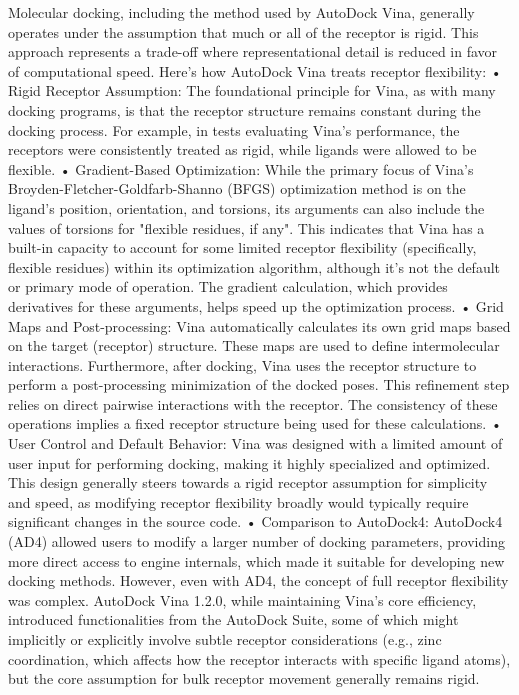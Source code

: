 \documentclass[11pt]{article}
\begin{document}
Molecular docking, including the method used by AutoDock Vina, generally operates under the assumption that much or all of the receptor is rigid. This approach represents a trade-off where representational detail is reduced in favor of computational speed.
Here's how AutoDock Vina treats receptor flexibility:
• Rigid Receptor Assumption: The foundational principle for Vina, as with many docking programs, is that the receptor structure remains constant during the docking process. For example, in tests evaluating Vina's performance, the receptors were consistently treated as rigid, while ligands were allowed to be flexible.
• Gradient-Based Optimization: While the primary focus of Vina's Broyden-Fletcher-Goldfarb-Shanno (BFGS) optimization method is on the ligand's position, orientation, and torsions, its arguments can also include the values of torsions for "flexible residues, if any". This indicates that Vina has a built-in capacity to account for some limited receptor flexibility (specifically, flexible residues) within its optimization algorithm, although it's not the default or primary mode of operation. The gradient calculation, which provides derivatives for these arguments, helps speed up the optimization process.
• Grid Maps and Post-processing: Vina automatically calculates its own grid maps based on the target (receptor) structure. These maps are used to define intermolecular interactions. Furthermore, after docking, Vina uses the receptor structure to perform a post-processing minimization of the docked poses. This refinement step relies on direct pairwise interactions with the receptor. The consistency of these operations implies a fixed receptor structure being used for these calculations.
• User Control and Default Behavior: Vina was designed with a limited amount of user input for performing docking, making it highly specialized and optimized. This design generally steers towards a rigid receptor assumption for simplicity and speed, as modifying receptor flexibility broadly would typically require significant changes in the source code.
• Comparison to AutoDock4: AutoDock4 (AD4) allowed users to modify a larger number of docking parameters, providing more direct access to engine internals, which made it suitable for developing new docking methods. However, even with AD4, the concept of full receptor flexibility was complex. AutoDock Vina 1.2.0, while maintaining Vina's core efficiency, introduced functionalities from the AutoDock Suite, some of which might implicitly or explicitly involve subtle receptor considerations (e.g., zinc coordination, which affects how the receptor interacts with specific ligand atoms), but the core assumption for bulk receptor movement generally remains rigid.
\end{document}
